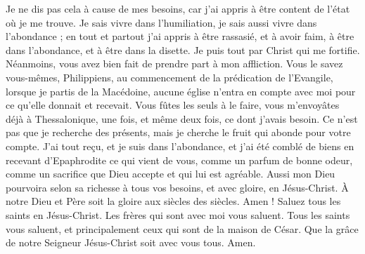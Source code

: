 \begin{multicols}{2}
Je ne dis pas cela à cause de mes besoins, car j’ai appris à être content de l’état où je me trouve.
Je sais vivre dans l’humiliation, je sais aussi vivre dans l'abondance ; en tout et partout j’ai appris à être rassasié, et à avoir faim, à être dans l'abondance, et à être dans la disette.
Je puis tout par Christ qui me fortifie.
Néanmoins, vous avez bien fait de prendre part à mon affliction.
Vous le savez vous-mêmes, Philippiens, au commencement de la prédication de l’Evangile, lorsque je partis de la Macédoine, aucune église n’entra en compte avec moi pour ce qu’elle donnait et recevait.
Vous fûtes les seuls à le faire, vous m’envoyâtes déjà à Thessalonique, une fois, et même deux fois, ce dont j'avais besoin.
Ce n'est pas que je recherche des présents, mais je cherche le fruit qui abonde pour votre compte.
J'ai tout reçu, et je suis dans l'abondance, et j'ai été comblé de biens en recevant d'Epaphrodite ce qui vient de vous, comme un parfum de bonne odeur, comme un sacrifice que Dieu accepte et qui lui est agréable.
Aussi mon Dieu pourvoira selon sa richesse à tous vos besoins, et avec gloire, en Jésus-Christ.
À notre Dieu et Père soit la gloire aux siècles des siècles. Amen !
Saluez tous les saints en Jésus-Christ. Les frères qui sont avec moi vous saluent.
Tous les saints vous saluent, et principalement ceux qui sont de la maison de César.
Que la grâce de notre Seigneur Jésus-Christ soit avec vous tous. Amen.
\PPE{}
\end{multicols}
